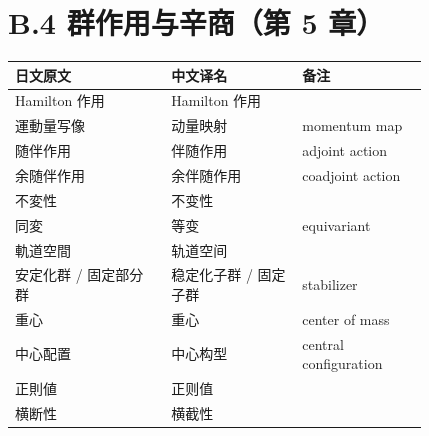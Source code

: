 \section*{B.4 群作用与辛商（第 5 章）}
{\small
\begin{longtable}{p{0.31\linewidth} p{0.26\linewidth} p{0.25\linewidth}}
\toprule
日文原文 & 中文译名 & 备注 \\
\midrule
\endhead
Hamilton 作用 & Hamilton 作用 &  \\
運動量写像 & 动量映射 & momentum map \\
随伴作用 & 伴随作用 & adjoint action \\
余随伴作用 & 余伴随作用 & coadjoint action \\
不変性 & 不变性 &  \\
同変 & 等变 & equivariant \\
軌道空間 & 轨道空间 &  \\
安定化群 / 固定部分群 & 稳定化子群 / 固定子群 & stabilizer \\
重心 & 重心 & center of mass \\
中心配置 & 中心构型 & central configuration \\
正則値 & 正则值 &  \\
横断性 & 横截性 &  \\
\bottomrule
\end{longtable}
}

